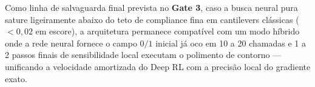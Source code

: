 \documentclass[11pt,a4paper]{article}
\begin{document}
Como linha de salvaguarda final prevista no \textbf{Gate 3}, caso a busca neural pura sature ligeiramente abaixo do teto de compliance fina em cantilevers clássicas ($< 0{,}02$ em escore), a arquitetura permanece compatível com um modo híbrido onde a rede neural fornece o campo $0/1$ inicial já oco em 10 a 20 chamadas e 1 a 2 passos finais de sensibilidade local executam o polimento de contorno — unificando a velocidade amortizada do Deep RL com a precisão local do gradiente exato.



\end{document}
